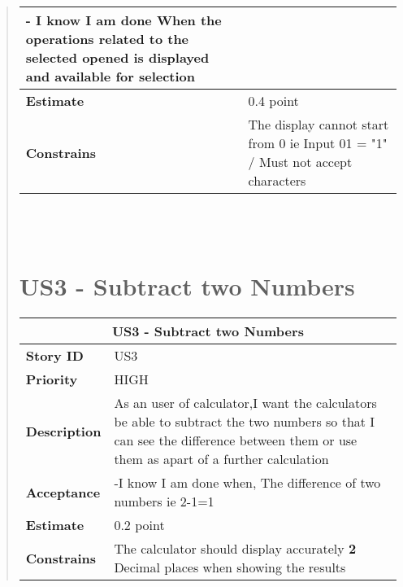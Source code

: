 \documentclass[12pt]{report}
\begin{document}
\begin{quote}
\begin{tabular}{ |p{4cm}|p{10cm}| }
                 - I know I am done When the operations related to the selected opened is displayed and available for selection 
                
                \\
                 \hline
                 \textbf{Estimate} &  0.4  point  \\
                 \hline
                 \textbf{Constrains}& The display cannot start from 0 ie Input 01 = "1" / Must not accept characters  \\
                 \hline
                \end{tabular}
            \hfill\break\\\\
        
         \section{US3 - Subtract two Numbers }
                \begin{tabular}{ |p{4cm}|p{10cm}| }
                 \hline
                 \multicolumn{2}{|c|}{\textbf{US3 - Subtract two Numbers} } \\
                 \hline
                 \textbf {Story ID}& US3  \\
                 \hline
                 \textbf{Priority} & HIGH \\
                 \hline
                 \textbf{Description}   &  As an user of calculator,I want the calculators be able to subtract the two numbers so that I can see the difference between them or use them as apart of a further calculation\\
                 \hline
                 \textbf{Acceptance}& 
                
                 -I know I am done when, The difference of two numbers ie 2-1=1
                
                \\
                 \hline
                 \textbf{Estimate} &  0.2  point  \\
                 \hline
                 \textbf{Constrains}& The calculator should display accurately \textbf{2} Decimal places when showing the results \\
                 \hline
                \end{tabular}
            
   \newpage

\end{quote}
\end{document}
